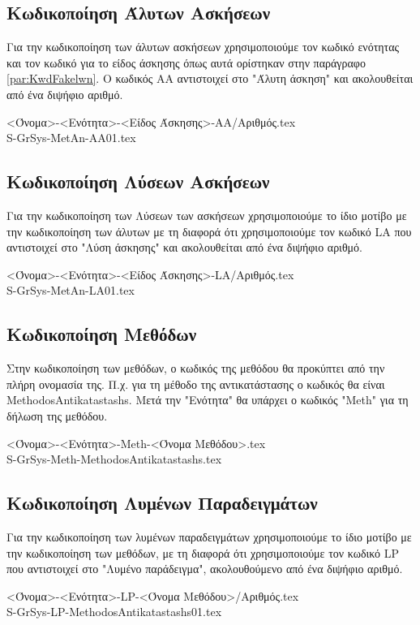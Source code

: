\documentclass[11pt,a4paper]{book}
\newcommand{\xr}[1]{\textcolor{red!80!black}{#1}}
\begin{document}
\subsection{Κωδικοποίηση Άλυτων Ασκήσεων}
Για την κωδικοποίηση των άλυτων ασκήσεων χρησιμοποιούμε τον κωδικό ενότητας και τον κωδικό για το είδος άσκησης όπως αυτά ορίστηκαν στην παράγραφο \ref{par:KwdFakelwn}. Ο κωδικός \xr{AA} αντιστοιχεί στο "Άλυτη άσκηση" και ακολουθείται από ένα διψήφιο αριθμό.
\begin{center}
<Όνομα>-<Ενότητα>-<Είδος Άσκησης>-AA/Αριθμός.tex\\
\xr{S}-GrSys-\xr{MetAn}-AA01.tex
\end{center}
\subsection{Κωδικοποίηση Λύσεων Ασκήσεων}
Για την κωδικοποίηση των Λύσεων των ασκήσεων χρησιμοποιούμε το ίδιο μοτίβο με την κωδικοποίηση των άλυτων με τη διαφορά ότι χρησιμοποιούμε τον κωδικό \xr{LA} που αντιστοιχεί στο "Λύση άσκησης" και ακολουθείται από ένα διψήφιο αριθμό.
\begin{center}
<Όνομα>-<Ενότητα>-<Είδος Άσκησης>-LA/Αριθμός.tex\\
\xr{S}-GrSys-\xr{MetAn}-LA01.tex
\end{center}
\subsection{Κωδικοποίηση Μεθόδων}
Στην κωδικοποίηση των μεθόδων, ο κωδικός της μεθόδου θα προκύπτει από την πλήρη ονομασία της. Π.χ. για τη μέθοδο της αντικατάστασης ο κωδικός θα είναι \xr{MethodosAntikatastashs}. Μετά την "Ενότητα" θα υπάρχει ο κωδικός "\xr{Meth}" για τη δήλωση της μεθόδου.
\begin{center}
<Όνομα>-<Ενότητα>-Meth-<Όνομα Μεθόδου>.tex\\
\xr{S}-GrSys-\xr{Meth}-MethodosAntikatastashs.tex
\end{center}
\subsection{Κωδικοποίηση Λυμένων Παραδειγμάτων}
Για την κωδικοποίηση των λυμένων παραδειγμάτων χρησιμοποιούμε το ίδιο μοτίβο με την κωδικοποίηση των μεθόδων, με τη διαφορά ότι χρησιμοποιούμε τον κωδικό \xr{LP} που αντιστοιχεί στο "Λυμένο παράδειγμα", ακολουθούμενο από ένα διψήφιο αριθμό.
\begin{center}
<Όνομα>-<Ενότητα>-LP-<Όνομα Μεθόδου>/Αριθμός.tex\\
\xr{S}-GrSys-\xr{LP}-MethodosAntikatastashs01.tex
\end{center}
\end{document}
